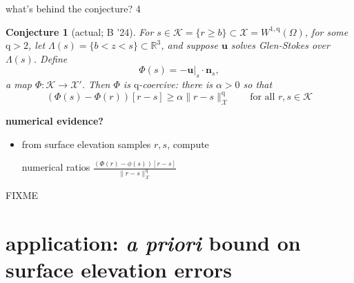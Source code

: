 \documentclass[10pt,svgnames]{beamer}
\newtheorem*{conjecture}{Conjecture}
\newcommand{\bn}{\mathbf{n}}
\newcommand{\bu}{\mathbf{u}}
\newcommand{\cK}{\mathcal{K}}
\newcommand{\cX}{\mathcal{X}}
\newcommand{\RR}{\mathbb{R}}
\newcommand{\qq}{\mathrm{q}}
\begin{document}
\begin{frame}{what's behind the conjecture? 4}

\bigskip
\begin{conjecture}[actual; B '24]
For $s \in \cK = \{r \ge b\} \subset \cX = W^{1,\qq}(\Omega)$, for some $\qq>2$, let $\Lambda(s) = \{b<z<s\} \subset \RR^3$, and suppose $\bu$ solves Glen-Stokes over $\Lambda(s)$.  Define
	$$\Phi(s) = - \bu|_s \cdot \bn_s,$$
a map $\Phi:\cK \to \cX'$.  Then $\Phi$ is $\qq$-coercive: there is $\alpha>0$ so that
	$$\left(\Phi(s) - \Phi(r)\right)[r-s] \ge \alpha \|r-s\|_\cX^\qq \qquad \text{for all } r,s\in\cK$$
\end{conjecture}

\bigskip
\footnotesize
\noindent \textbf{numerical evidence?}

\begin{itemize}
\item from surface elevation samples $r,s$, compute

numerical ratios $\displaystyle \frac{(\Phi(r)-\phi(s))[r-s]}{\|r-s\|_\cX^\qq}$
\end{itemize}

\vspace{-22mm}
FIXME %
\end{frame}


\section{application:  \emph{a priori} bound on surface elevation errors}
\end{document}
